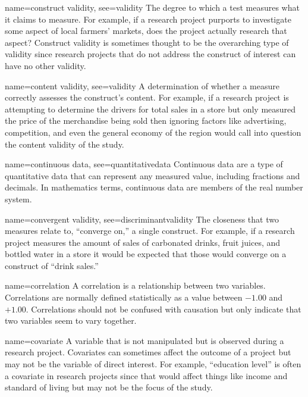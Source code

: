 {name={construct validity},
	see={validity}}
{%
	The degree to which a test measures what it claims to measure. For example, if a research project purports to investigate some aspect of local farmers' markets, does the project actually research that aspect? Construct validity is sometimes thought to be the overarching type of validity since research projects that do not address the construct of interest can have no other validity.
}

{name={content validity},
	see={validity}}
{%
	A determination of whether a measure correctly assesses the construct's content. For example, if a research project is attempting to determine the drivers for total sales in a store but only measured the price of the merchandise being sold then ignoring factors like advertising, competition, and even the general economy of the region would call into question the content validity of the study.
}

{name={continuous data},
	see={quantitativedata}}
{%
	Continuous data are a type of quantitative data that can represent any measured value, including fractions and decimals. In mathematics terms, continuous data are members of the real number system. 
}


{name={convergent validity},
	see={discriminantvalidity}}
{%
	The closeness that two measures relate to, ``converge on,'' a single construct. For example, if a research project measures the amount of sales of carbonated drinks, fruit juices, and bottled water in a store it would be expected that those would converge on a construct of ``drink sales.''
}

{name={correlation}}
{%
	A correlation is a relationship between two variables. Correlations are normally defined statistically as a value between $ -1.00 $ and $ +1.00 $. Correlations should not be confused with causation but only indicate that two variables seem to vary together. 
}

{name={covariate}}
{%
	A variable that is not manipulated but is observed during a research project. Covariates can sometimes affect the outcome of a project but may not be the variable of direct interest. For example, ``education level'' is often a covariate in research projects since that would affect things like income and standard of living but may not be the focus of the study.
}

